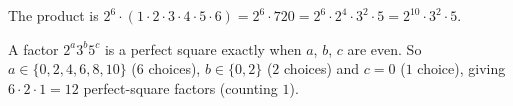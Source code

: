 The product is $2^6\cdot(1\cdot2\cdot3\cdot4\cdot5\cdot6)=2^6\cdot720=2^6\cdot2^4\cdot3^2\cdot5=2^{10}\cdot3^2\cdot5$.

A factor $2^a3^b5^c$ is a perfect square exactly when $a$, $b$, $c$ are even. So $a\in\{0,2,4,6,8,10\}$ ($6$ choices), $b\in\{0,2\}$ ($2$ choices) and $c=0$ ($1$ choice), giving $6\cdot2\cdot1=\boxed{12}$ perfect-square factors (counting $1$).
